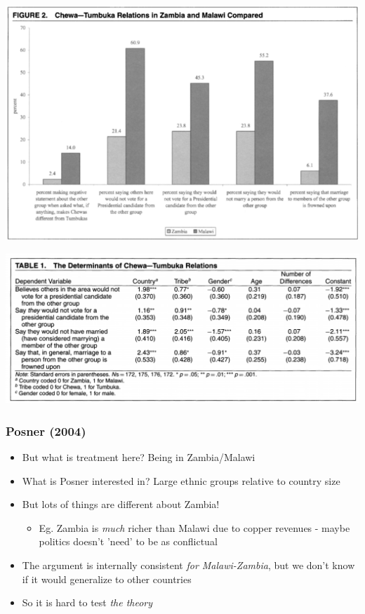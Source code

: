 \documentclass[xcolor=x11names,compress]{beamer}\usepackage[]{graphicx}\usepackage[]{color}
\renewcommand{\(}{\begin{columns}}
\renewcommand{\)}{\end{columns}}
\newcommand{\<}[1]{\begin{column}{#1}}
\renewcommand{\>}{\end{column}}
\begin{document}
\begin{frame}
\includegraphics[width=1\textwidth]{Posner_results.png}
\end{frame}

\begin{frame}
\includegraphics[width=1\textwidth]{Posner_table.png}
\end{frame}

\begin{frame}
\frametitle{Posner (2004)}
\begin{itemize}
\item But what is treatment here? \pause Being in Zambia/Malawi
\pause 
\item What is Posner interested in? \pause Large ethnic groups relative to country size
\pause
\item But lots of things are different about Zambia!
\pause
\begin{itemize}
\item Eg. Zambia is \textit{much} richer than Malawi due to copper revenues - maybe politics doesn't 'need' to be as conflictual
\end{itemize}
\item The argument is internally consistent \textit{for Malawi-Zambia}, but we don't know if it would generalize to other countries
\pause
\item So it is hard to test \textit{the theory}
\end{itemize}
\end{frame}
\end{document}
